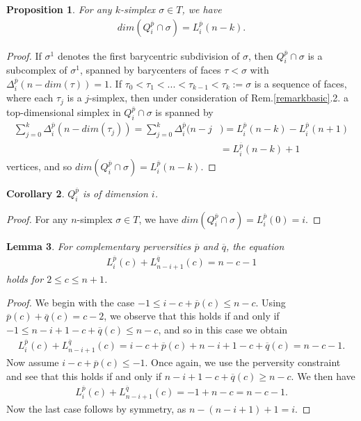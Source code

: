 \documentclass{scrreprt}
\newtheorem{prop}{Proposition}[chapter]
\newtheorem{lemma}[prop]{Lemma}
\newtheorem{corollar}[prop]{Corollary}
\begin{document}
\begin{prop}\label{dimensionbasicset}
For any $k$-simplex $\sigma \in T$,  we have 
\begin{align*}
dim(Q_i^{\overline{p}} \cap \sigma)= L_i^{\overline{p}}(n-k).
\end{align*}
\end{prop}

\begin{proof}
If $\sigma^1$ denotes the first barycentric subdivision of $\sigma$, then $Q_i^{\overline{p}} \cap \sigma$ is a subcomplex of $\sigma^1$, spanned by barycenters of faces $\tau < \sigma$ with $\Delta_i^{\overline{p}}(n-dim(\tau))=1$. If $\tau_0 < \tau_1 < ... < \tau_{k-1} < \tau_k:= \sigma$ is a sequence of faces, where each $\tau_j$ is a $j$-simplex, then under consideration of Rem.\ref{remarkbasic}.2. a top-dimensional simplex in $Q_i^{\overline{p}} \cap \sigma$ is spanned by 
\begin{align*}
\sum_{j=0}^k \Delta_i^{\overline{p}}(n-dim(\tau_j)) = \sum_{j=0}^k \Delta_i^{\overline{p}}(n-j &)= L_i^{\overline{p}}(n-k) - L_i^{\overline{p}}(n+1) \\ &=L_i^{\overline{p}}(n-k) +1
\end{align*}
vertices, and so $dim(Q_i^{\overline{p}} \cap \sigma)= L_i^{\overline{p}}(n-k).$
\end{proof}

\begin{corollar}
$Q_i^{\overline{p}}$ is of dimension $i$.
\end{corollar}

\begin{proof}
For any $n$-simplex $\sigma \in T$, we have $dim(Q_i^{\overline{p}} \cap \sigma)=L_i^{\overline{p}}(0)=i$.
\end{proof}

\begin{lemma}\label{lemmabasicsets}
For complementary perversities $\overline{p}$ and $\overline{q}$, the equation
\begin{align*}
L_i^{\overline{p}}(c) + L_{n-i+1}^{\overline{q}}(c)=n-c-1
\end{align*}
holds for $2 \leq c \leq n+1$.
\end{lemma}

\begin{proof}
We begin with the case $-1 \leq i-c + \overline{p}(c) \leq n-c$. Using $\overline{p}(c)+ \overline{q}(c)=c-2$, we observe that this holds if and only if $-1 \leq n-i+1-c + \overline{q}(c) \leq n-c$, and so in this case we obtain
\begin{align*}
L_i^{\overline{p}}(c) + L_{n-i+1}^{\overline{q}}(c)=i-c+ \overline{p}(c)+ n-i+1-c+ \overline{q}(c)   =n-c-1.
\end{align*}
Now assume $i-c + \overline{p}(c) \leq -1$. Once again, we use the perversity constraint and see that this holds if and only if $n-i+1-c+ \overline{q}(c) \geq n-c$. We then have
\begin{align*}
L_i^{\overline{p}}(c) + L_{n-i+1}^{\overline{q}}(c)=-1 + n-c =n-c-1.
\end{align*}
Now the last case follows by symmetry, as $n-(n-i+1)+1=i$.
\end{proof}
\end{document}
